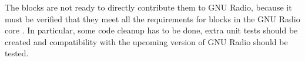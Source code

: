 \medskip

The blocks are not ready to directly contribute them to GNU Radio, because it must be verified that they meet all the requirements for blocks in the GNU Radio core \cite{gr_development}. In particular, some code cleanup has to be done, extra unit tests should be created and compatibility with the upcoming version of GNU Radio should be tested. 
